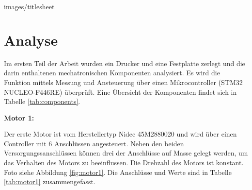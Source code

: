 \documentclass[a4paper,twoside,12pt,DIV=13,BCOR=5mm,numbers=noenddot,cleardoublepage=empty]{scrbook}
\begin{document}
\renewcommand{\baselinestretch}{1.25}

\large

{images/titlesheet}     %




\chapter{Analyse}

Im ersten Teil der Arbeit wurden ein Drucker und eine Festplatte zerlegt und die darin enthaltenen mechatronischen Komponenten analysiert.
Es wird die Funktion mittels Messung und Ansteuerung über einen Mikrocontroller (STM32 NUCLEO-F446RE) überprüft.
Eine Übersicht der Komponenten findet sich in Tabelle \ref{tab:components}.


\textbf{Motor 1:}

Der erste Motor ist vom Herstellertyp Nidec 45M2880020 und wird über einen Controller mit 6 Anschlüssen angesteuert.
Neben den beiden Versorgungssanschlüssen können drei der Anschlüsse auf Masse gelegt werden, um das Verhalten des Motors zu beeinflussen.
Die Drehzahl des Motors ist konstant.
Foto siehe Abbildung \ref{fig:motor1}. Die Anschlüsse und Werte sind in Tabelle \ref{tab:motor1} zusammengefasst.
\end{document}
